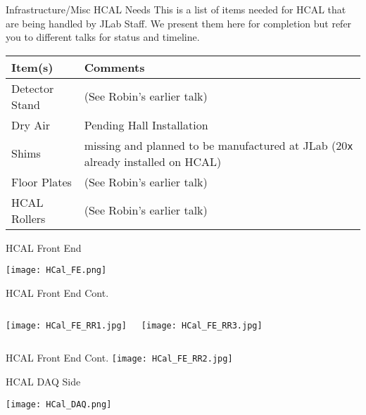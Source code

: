 \documentclass[10pt]{beamer}
\newcommand{\hcal}{HCAL}
\newcommand{\Rx}{\texttt{x}}
\newcommand{\xtimes}[1]{#1{\Rx}}
\begin{document}
\begin{frame}{Infrastructure/Misc HCAL Needs}
This is a list of items needed for HCAL that are being handled by JLab Staff. We present them here for completion but refer you to different talks for status and timeline.
	\begin{table}[t]
	\centering
	\begin{tabular}{|l>{\raggedright\arraybackslash}p{4.5cm}|}
	\hline
	{\bfseries{Item(s)}} & \bfseries{Comments} \\
	\hline
	Detector Stand & (See Robin's earlier talk) \\
	\hline
	Dry Air & Pending Hall Installation \\
	\hline
	Shims & \xtimes{3} missing and planned to be manufactured at JLab (\xtimes{20} already installed on HCAL)\\ 
	\hline
	Floor Plates & (See Robin's earlier talk)\\
	\hline
	{\hcal} Rollers & (See Robin's earlier talk)\\
	\hline
	\end{tabular}
	\label{tab:status}
	\end{table}
\end{frame}

\begin{frame}{{\hcal} Front End}

	\texttt{[image: HCal\_FE.png]}

\end{frame}

\begin{frame}{{\hcal} Front End Cont.}

    \begin{columns}[T,onlytextwidth]
	\texttt{[image: HCal\_FE\_RR1.jpg]}
	
	\texttt{[image: HCal\_FE\_RR3.jpg]}
	\end{columns}

\end{frame}

\begin{frame}{{\hcal} Front End Cont.}
    \centering
	\texttt{[image: HCal\_FE\_RR2.jpg]}

\end{frame}

\begin{frame}{{\hcal} DAQ Side}

	\texttt{[image: HCal\_DAQ.png]}

\end{frame}
\end{document}
